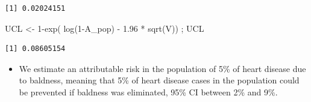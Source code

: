 \documentclass[
  letterpaper,
  DIV=11,
  numbers=noendperiod]{scrartcl}
\newenvironment{Shaded}{\begin{snugshade}}{\end{snugshade}}
\newcommand{\DecValTok}[1]{\textcolor[rgb]{0.68,0.00,0.00}{#1}}
\newcommand{\FloatTok}[1]{\textcolor[rgb]{0.68,0.00,0.00}{#1}}
\newcommand{\FunctionTok}[1]{\textcolor[rgb]{0.28,0.35,0.67}{#1}}
\newcommand{\NormalTok}[1]{\textcolor[rgb]{0.00,0.23,0.31}{#1}}
\newcommand{\OtherTok}[1]{\textcolor[rgb]{0.00,0.23,0.31}{#1}}
\newcommand{\SpecialCharTok}[1]{\textcolor[rgb]{0.37,0.37,0.37}{#1}}
\providecommand{\tightlist}{%
  \setlength{\itemsep}{0pt}\setlength{\parskip}{0pt}}\usepackage{longtable,booktabs,array}
\begin{document}
\begin{verbatim}
[1] 0.02024151
\end{verbatim}

\begin{Shaded}
\begin{Highlighting}[]
\NormalTok{UCL }\OtherTok{\textless{}{-}}  \DecValTok{1}\SpecialCharTok{{-}}\FunctionTok{exp}\NormalTok{( }\FunctionTok{log}\NormalTok{(}\DecValTok{1}\SpecialCharTok{{-}}\NormalTok{A\_pop) }\SpecialCharTok{{-}} \FloatTok{1.96} \SpecialCharTok{*} \FunctionTok{sqrt}\NormalTok{(V))  ; UCL}
\end{Highlighting}
\end{Shaded}

\begin{verbatim}
[1] 0.08605154
\end{verbatim}

\begin{itemize}
\tightlist
\item
  We estimate an attributable risk in the population of 5\% of heart
  disease due to baldness, meaning that 5\% of heart disease cases in
  the population could be prevented if baldness was eliminated, 95\% CI
  between 2\% and 9\%.
\end{itemize}
\end{document}
